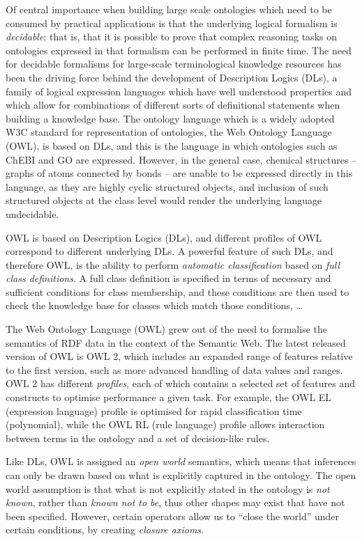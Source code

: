 \documentclass[10pt]{bmc_article}
\newenvironment{bmcformat}{\baselineskip20pt\sloppy\setboolean{publ}{false}}{\baselineskip20pt\sloppy}
\begin{document}
\begin{bmcformat}
Of central importance when building large scale ontologies which need to be consumed by practical applications is that the underlying logical formalism is \textit{decidable}: that is, that it is possible to prove that complex reasoning tasks on ontologies expressed in that formalism can be performed in finite time.  The need for decidable formalisms for large-scale terminological knowledge resources has been the driving force behind the development of Description Logics (DLs), a family of logical expression languages which have well understood properties and which allow for combinations of different sorts of definitional statements when building a knowledge base.  The ontology language which is a widely adopted W3C standard for representation of ontologies, the Web Ontology Language (OWL), is based on DLs, and this is the language in which ontologies such as ChEBI and GO are expressed. However, in the general case, chemical structures -- graphs of atoms connected by bonds -- are unable to be expressed directly in this language, as they are highly cyclic structured objects, and inclusion of such structured objects at the class level would render the underlying language undecidable.   
 
OWL is based on Description Logics (DLs), and different profiles of OWL correspond to different underlying DLs.  A powerful feature of such DLs, and therefore OWL, is the ability to perform \textit{automatic classification} based on \textit{full class definitions}.  A full class definition is specified in terms of necessary and sufficient conditions for class membership, and these conditions are then used to check the knowledge base for classes which match those conditions, \ldots

The Web Ontology Language (OWL) grew out of the need to formalise the semantics of RDF data in the context of the Semantic Web.  The latest released version of OWL is OWL 2, which includes an expanded range of features relative to the first version, such as more advanced handling of data values and ranges. OWL 2 has different \textit{profiles}, each of which contains a selected set of features and constructs to optimise performance a given task.  For example, the OWL EL (expression language) profile is optimised for rapid classification time (polynomial), while the OWL RL (rule language) profile allows interaction between terms in the ontology and a set of decision-like rules.   

Like DLs, OWL is assigned an \textit{open world} semantics, which means that inferences can only be drawn based on what is explicitly captured in the ontology. The open world assumption is that what is not explicitly stated in the ontology is \textit{not known}, rather than \textit{known not to be}, thus other shapes may exist that have not been specified. However, certain operators allow us to ``close the world'' under certain conditions, by creating \textit{closure axioms}. 


\end{bmcformat}
\end{document}
